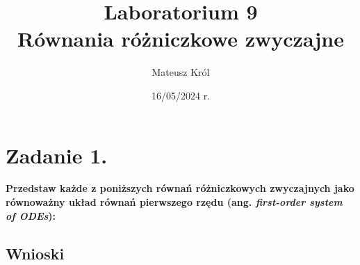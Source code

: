 \documentclass{article}
\title{%
Laboratorium 9\\
  \huge Równania różniczkowe zwyczajne}
\author{Mateusz Król}
\date{16/05/2024 r.}
\begin{document}
\maketitle

 
\section*{Zadanie 1.}
\textbf{Przedstaw każde z poniższych równań różniczkowych zwyczajnych
jako równoważny układ równań pierwszego rzędu (ang. \textit{first-order system of ODEs}):}


\subsection*{Wnioski}
\null\quad 
\end{document}
